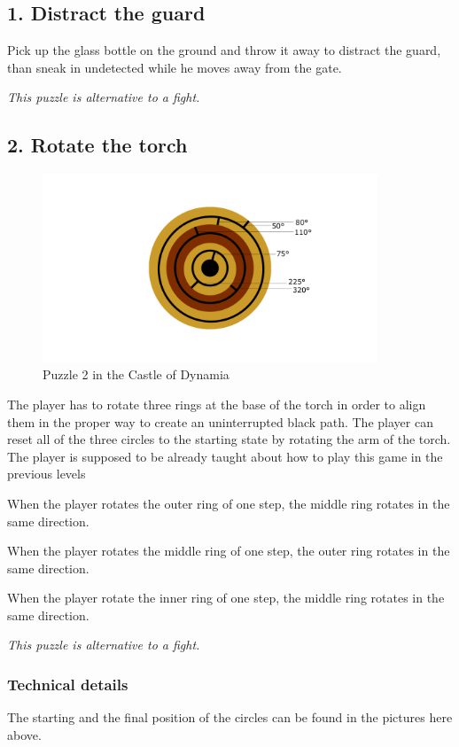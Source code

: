 \subsection{1. Distract the guard}

Pick up the glass bottle on the ground and throw it away to distract the guard, than sneak in undetected while he moves away from the gate.

\textit{This puzzle is alternative to a fight.}


\subsection{2. Rotate the torch}

\begin{figure}[H]
  \centering
  \includegraphics[width=10cm]{Images/Puzzles/castleOfDynamia2}
  \caption{Puzzle 2 in the Castle of Dynamia}
\end{figure}

The player has to rotate three rings at the base of the torch in order to align them in the proper way to create an uninterrupted black path. The player can reset all of the three circles to the starting state by rotating the arm of the torch. The player is supposed to be already taught about how to play this game in the previous levels

When the player rotates the outer ring of one step, the middle ring rotates in the same direction.

When the player rotates the middle ring of one step, the outer ring rotates in the same direction.

When the player rotate the inner ring of one step, the middle ring rotates in the same direction.

\textit{This puzzle is alternative to a fight.}

\subsubsection*{Technical details}
The starting and the final position of the circles can be found in the pictures here above.

